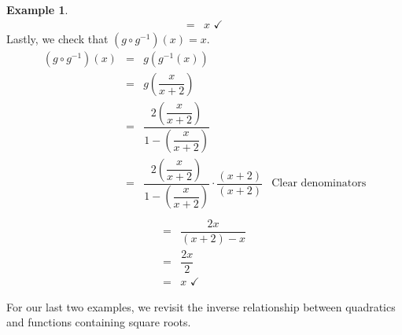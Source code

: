 \documentclass[12pt]{book}
\theoremstyle{definition}
\newtheorem{example}{Example}
\begin{document}
\begin{example}
\[\begin{array}{rclr}
& = & x \, \, \checkmark & 
\end{array} \]
Lastly, we check that $\left(g \circ g^{-1} \right)(x) = x $.
\[ \begin{array}{rclr}
\left(g \circ g^{-1} \right)(x) & = & g\left(g^{-1}(x)\right) & \\ [15pt]
 & = & g \left(\dfrac{x}{x+2}\right) & \\ [15pt]
& = & \dfrac{ 2\left(\dfrac{x}{x+2}\right)}{ 1-\left(\dfrac{x}{x+2}\right)} \\ [30pt]
& = & \dfrac{ 2\left(\dfrac{x}{x+2}\right)}{ 1-\left(\dfrac{x}{x+2}\right)} \cdot \dfrac{(x+2)}{(x+2)}  & \mbox{Clear denominators} \\ [30pt]
\end{array} \]
\[ \begin{array}{rclr}
& = & \dfrac{ 2x}{ (x+2) -x} & \\ [15pt]
& = & \dfrac{2x}{2} & \\ [15pt]
& = & x \, \, \checkmark 
\end{array} \]
\end{example}  
For our last two examples, we revisit the inverse relationship between quadratics and functions containing square roots.
\end{document}
